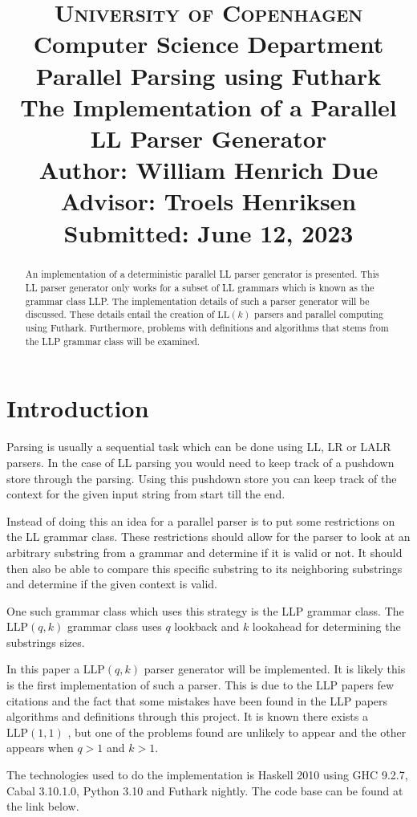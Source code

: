 \documentclass[a4paper,12pt]{article}
\title{
    {\Large \textsc{University of Copenhagen}} \\[0pt]
    {\large Computer Science Department} \\[10pt]
    {\Large Parallel Parsing using Futhark} \\[4pt]
    {\large The Implementation of a Parallel LL Parser Generator} \\[10pt]
    Author: William Henrich Due \\[0pt]
    Advisor: Troels Henriksen \\[0pt]
    Submitted: June 12, 2023
}
\author{}
\date{}
\newcommand\LL{\text{LL}}
\newcommand\LLP{\text{LLP}}
\theoremstyle{definition}
\begin{document}
\maketitle
\thispagestyle{firstpage}
\begin{abstract}
\noindent An implementation of a deterministic parallel LL parser generator is presented. This LL parser generator only works for a subset of LL grammars which is known as the grammar class LLP. The implementation details of such a parser generator will be discussed. These details entail the creation of $\LL(k)$ parsers and parallel computing using Futhark. Furthermore, problems with definitions and algorithms that stems from the LLP grammar class will be examined.
\end{abstract}

\tableofcontents

\section{Introduction}
Parsing is usually a sequential task which can be done using LL, LR or LALR parsers. In the case of LL parsing you would need to keep track of a pushdown store through the parsing. Using this pushdown store you can keep track of the context for the given input string from start till the end.

Instead of doing this an idea for a parallel parser is to put some restrictions on the LL grammar class. These restrictions should allow for the parser to look at an arbitrary substring from a grammar and determine if it is valid or not. It should then also be able to compare this specific substring to its neighboring substrings and determine if the given context is valid.

One such grammar class which uses this strategy is the LLP grammar class. The $\LLP(q, k)$ grammar class uses $q$ lookback and $k$ lookahead for determining the substrings sizes.

In this paper a $\LLP(q, k)$ parser generator will be implemented. It is likely this is the first implementation of such a parser. This is due to the LLP papers \cite{Vagner2007} few citations and the fact that some mistakes have been found in the LLP papers algorithms and definitions through this project. It is known there exists a $\LLP(1, 1)$ \cite{voetter2021}, but one of the problems found are unlikely to appear and the other appears when $q > 1$ and $k > 1$.

The technologies used to do the implementation is Haskell 2010 using GHC 9.2.7, Cabal 3.10.1.0, Python 3.10 and Futhark nightly. The code base can be found at the link below. \newline
\end{document}
